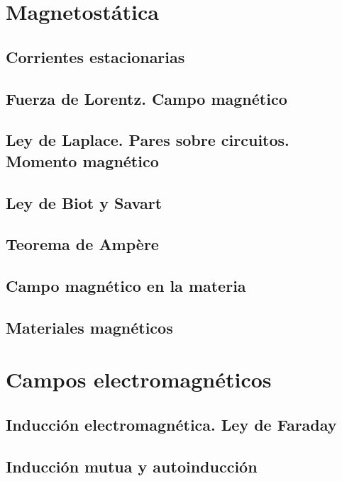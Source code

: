 \documentclass[a4paper]{book}
\numberwithin{figure}{chapter}
\numberwithin{equation}{chapter}
\begin{document}
\chapter{Magnetostática}


\section{Corrientes estacionarias}

\section{Fuerza de Lorentz. Campo magnético}

\section{ Ley de Laplace. Pares sobre circuitos. Momento magnético}

\section{Ley de Biot y Savart}

\section{Teorema de Ampère}

\section{Campo magnético en la materia}

\section{Materiales magnéticos}




\chapter{Campos electromagnéticos}

\section{Inducción electromagnética. Ley de Faraday}

\section{Inducción mutua y autoinducción}
\end{document}
